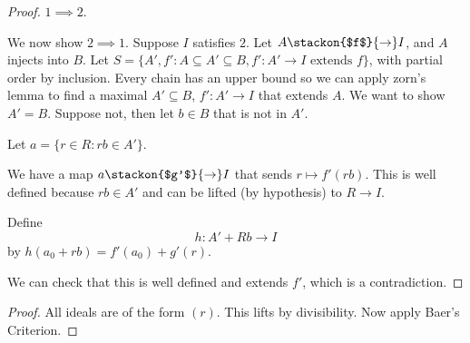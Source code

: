 \begin{proof}
    $1\implies 2$.

    We now show $2\implies 1$.
    Suppose $I$ satisfies $2$. 
    Let $A\stackon{$f$}{\to} I$, and $A$ injects into $B$.
    Let $S=\{A',f': A\subseteq A'\subseteq B, f':A'\to I \textrm{ extends } f\}$, with partial order by inclusion. Every chain has an upper bound so we can apply zorn's lemma to find a maximal $A'\subseteq B $, $f':A'\to I$ that extends $A$. We want to show $A'=B$. Suppose not, then let $b\in B$ that is not in $A'$. 

    Let $a=\{r\in R: rb\in A'\}$. 

    We have a map $a\stackon{$g'$}{\to} I$ that sends $r\mapsto f'(rb)$. This is well defined because $rb\in A'$ and can be lifted (by hypothesis) to $R\to I$.

    Define \[
    h:A' + Rb \to I
    \]
    by $h(a_0 + rb) = f'(a_0)+g'(r)$.

    We can check that this is well defined and extends $f'$, which is a contradiction. 
\end{proof}

\begin{proof}
    All ideals are of the form $(r)$. This lifts by divisibility. Now apply Baer's Criterion.
\end{proof}